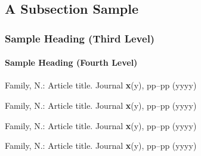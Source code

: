 \documentclass[runningheads]{llncs}
\begin{document}
\subsection{A Subsection Sample}

\subsubsection{Sample Heading (Third Level)}

\paragraph{Sample Heading (Fourth Level)}

\cite{ref_author1}
\cite{ref_author2}
\cite{ref_author3,ref_author4}

\begin{thebibliography}{8}
Family, N.: Article title. Journal \textbf{x}(y), pp--pp (yyyy)

Family, N.: Article title. Journal \textbf{x}(y), pp--pp (yyyy)

Family, N.: Article title. Journal \textbf{x}(y), pp--pp (yyyy)

Family, N.: Article title. Journal \textbf{x}(y), pp--pp (yyyy)
\end{thebibliography}
\end{document}
